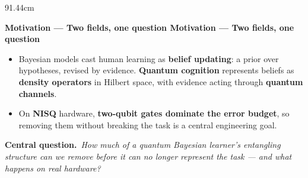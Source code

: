 \documentclass[final]{beamer}
\newlength{\colw}
\newcommand{\secbar}[2]{%
  \vspace{0.15ex}%
  \begin{tcolorbox}[
      enhanced, sharp corners, boxrule=0pt, frame hidden,
      colback=dukenavy, left=10pt, right=10pt, top=7pt, bottom=7pt,
      width=\linewidth, before skip=4pt, after skip=8pt]
    \color{white}\bfseries\large
    \if\relax\detokenize{#1}\relax
      #2%
    \else
      \makebox[1.55cm][l]{[#1]}\hspace{0.2cm}#2%
    \fi
  \end{tcolorbox}%
}
\newcommand{\tl}{\textbf}  %
\begin{document}
\begin{frame}[t]{}
\begin{textblock*}{91.44cm}
\begin{minipage}[t]{\colw}
\secbar{1}{Motivation — Two fields, one question}
\begin{cbox}
\begin{itemize}
  \item Bayesian models cast human learning as \tl{belief updating}: a prior over
        hypotheses, revised by evidence. \tl{Quantum cognition} represents beliefs as
        \tl{density operators} in Hilbert space, with evidence acting through
        \tl{quantum channels}.
  \item On \tl{NISQ} hardware, \tl{two-qubit gates dominate the error budget}, so
        removing them without breaking the task is a central engineering goal.
\end{itemize}
\vspace{6pt}
\begin{tcolorbox}[enhanced, sharp corners, boxrule=0pt, frame hidden,
    colback=dukenavy!8, left=10pt,right=10pt,top=8pt,bottom=8pt, width=\linewidth]
  \color{dukenavy}\textbf{Central question.}\ \textit{How much of a quantum Bayesian
  learner's entangling structure can we remove before it can no longer represent the
  task — and what happens on real hardware?}
\end{tcolorbox}
\end{cbox}


\end{minipage}
\end{textblock*}
\end{frame}
\end{document}
